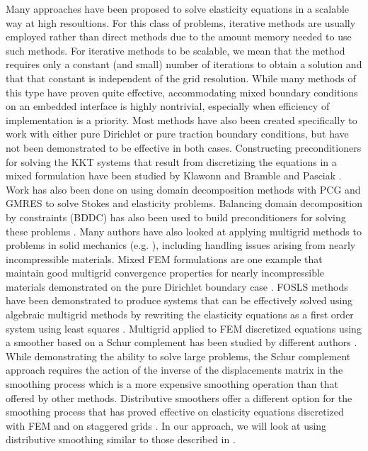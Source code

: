 Many approaches have been proposed to solve elasticity equations in a scalable way at high resoultions.  For this class of problems, iterative methods are usually employed rather than
direct methods due to the amount memory needed to use such methods.  For iterative methods to be scalable, we mean that the method requires only a constant (and small) number of
iterations to obtain a solution and that that constant is independent of the grid resolution.  While many methods of this type have proven quite effective, 
 accommodating mixed boundary conditions on an embedded interface is highly nontrivial, especially when efficiency of implementation is a priority.
  Most methods have also been created specifically to work with either pure Dirichlet or pure traction boundary conditions, but have not been demonstrated to be effective in both cases.  Constructing preconditioners for solving the KKT systems that result from discretizing the equations in a mixed formulation have been studied by Klawonn \cite{klawonn1998block, klawonn1998optimal} and Bramble and Pasciak \cite{bramble1998pcg}.  Work has also been done on using domain decomposition methods with PCG \cite{farhat2000scalable} and GMRES \cite{klawonn1998overlapping} to solve Stokes and elasticity problems.  Balancing domain decomposition by constraints (BDDC) has also been used to build preconditioners for solving these problems \cite{dohrmann2003preconditioner, pavarino_incompressible}.  Many authors have also looked at applying multigrid methods to problems in solid mechanics (e.g. \cite{zhu2009efficient, verfurth1984multilevel, kocvara1987, huang1990multi, brenner1993nonconforming, cai1998first, hiptmairHoppe1999, axelsson1999robust, schoberl1999multigrid, wieners2000robust, heys2004first, lee2009, gaspar:2008:distributive}), including handling issues arising from nearly incompressible materials.  Mixed FEM formulations are one example that maintain good multigrid convergence properties for nearly incompressible materials demonstrated on the pure Dirichlet boundary case \cite{brenner1993nonconforming, schoberl1999multigrid, lee2009}. FOSLS methods have been demonstrated to produce systems that can be effectively solved using algebraic multigrid methods by rewriting the elasticity equations as a first order system using least squares \cite{cai1998first, heys2004first}.  Multigrid applied to FEM discretized equations using a smoother based on a Schur complement has been studied by different authors \cite{axelsson1999robust, wieners2000robust}.  While demonstrating the ability to solve large problems, the Schur complement approach requires the action of the inverse of the displacements matrix in the smoothing process which is a more expensive smoothing operation than that offered by other methods.  Distributive smoothers offer a different option for the smoothing process that has proved effective on elasticity equations discretized with FEM \cite{hiptmairHoppe1999} and on staggered grids \cite{gaspar:2008:distributive}.  In our approach, we will look at using distributive smoothing similar to those described in \cite{gaspar:2008:distributive}.

